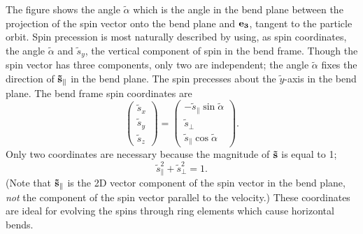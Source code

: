 \documentclass[]{article}
\begin{document}
The figure shows the angle $\tilde\alpha$ which is the
angle in the bend plane between the 
projection of the spin vector onto the bend plane
and ${\bf e_3}$, tangent to the particle orbit. 
Spin precession is most naturally described by using, 
as spin coordinates, the angle 
$\tilde\alpha$ and $\tilde s_y$, the vertical component of spin
in the bend frame.
Though the spin vector has three components, only two
are independent; the angle $\tilde\alpha$ fixes the direction
of ${\bf \tilde s_{\parallel}}$ in the bend plane.
The spin precesses about the $\tilde y$-axis in the bend plane.
The bend frame spin coordinates are 
%
\begin{equation}
\begin{pmatrix} \tilde s_x \\ \tilde s_y \\ \tilde s_z \end{pmatrix}
 =
\begin{pmatrix}
 -\tilde s_{\parallel}\sin\tilde\alpha \\ 
   \tilde s_{\perp} \\ 
   \tilde s_{\parallel}\cos\tilde\alpha \end{pmatrix}.
\label{eq:SpinPrecess.0m}
\end{equation}
%
Only two coordinates are necessary because the
magnitude of ${\bf \tilde s}$ is equal to 1;
%
\begin{equation}
\tilde s_{\parallel}^2 + \tilde s_{\perp}^2 = 1.
\label{eq:SpinPrecess.0}
\end{equation}
%
(Note that ${\bf \tilde s}_{\parallel}$ is the 2D vector
component of the spin vector in the bend plane,
\emph{not} the component of the spin vector parallel
to the velocity.) 
These coordinates are ideal for evolving the
spins through ring elements which cause horizontal
bends.  
\end{document}
